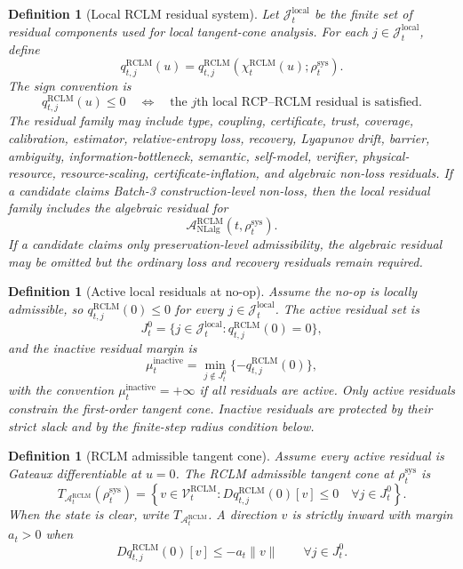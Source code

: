 \documentclass[11pt,a4paper]{article}
\newtheorem{definition}[theorem]{Definition}
\newcommand{\Acal}{\mathcal A}
\newcommand{\RCLM}{\mathrm{RCLM}}
\newcommand{\sys}{\mathrm{sys}}
\newcommand{\local}{\mathrm{local}}
\newcommand{\NLalg}{\mathrm{NLalg}}
\begin{document}
\begin{definition}[Local RCLM residual system]
\label{def:rclm-local-residual-system}
Let \(\mathcal J_t^{\local}\) be the finite set of residual components used for local tangent-cone analysis.  For each \(j\in\mathcal J_t^{\local}\), define
\[
q_{t,j}^{\RCLM}(u)
=
q_{t,j}^{\RCLM}(\chi_t^{\RCLM}(u);\rho_t^{\sys}).
\]
The sign convention is
\[
q_{t,j}^{\RCLM}(u)\le0
\quad\Longleftrightarrow\quad
\text{the }j\text{th local RCP--RCLM residual is satisfied.}
\]
The residual family may include type, coupling, certificate, trust, coverage, calibration, estimator, relative-entropy loss, recovery, Lyapunov drift, barrier, ambiguity, information-bottleneck, semantic, self-model, verifier, physical-resource, resource-scaling, certificate-inflation, and algebraic non-loss residuals.  If a candidate claims Batch-3 construction-level non-loss, then the local residual family includes the algebraic residual for
\[
\Acal_{\NLalg}^{\RCLM}(t,\rho_t^{\sys}).
\]
If a candidate claims only preservation-level admissibility, the algebraic residual may be omitted but the ordinary loss and recovery residuals remain required.
\end{definition}

\begin{definition}[Active local residuals at no-op]
\label{def:rclm-active-local-residuals}
Assume the no-op is locally admissible, so \(q_{t,j}^{\RCLM}(0)\le0\) for every \(j\in\mathcal J_t^{\local}\).  The active residual set is
\[
J_t^0=
\{j\in\mathcal J_t^{\local}:q_{t,j}^{\RCLM}(0)=0\},
\]
and the inactive residual margin is
\[
\mu_t^{\mathrm{inactive}}
=
\min_{j\notin J_t^0}\{-q_{t,j}^{\RCLM}(0)\},
\]
with the convention \(\mu_t^{\mathrm{inactive}}=+\infty\) if all residuals are active.  Only active residuals constrain the first-order tangent cone.  Inactive residuals are protected by their strict slack and by the finite-step radius condition below.
\end{definition}

\begin{definition}[RCLM admissible tangent cone]
\label{def:rclm-admissible-tangent-cone}
Assume every active residual is Gateaux differentiable at \(u=0\).  The RCLM admissible tangent cone at \(\rho_t^{\sys}\) is
\[
T_{\Acal_t^{\RCLM}}(\rho_t^{\sys})
=
\left\{
 v\in\mathcal V_t^{\RCLM}:
Dq_{t,j}^{\RCLM}(0)[v]\le0\quad\forall j\in J_t^0
\right\}.
\]
When the state is clear, write \(T_{\Acal_t^{\RCLM}}\).  A direction \(v\) is \emph{strictly inward} with margin \(a_t>0\) when
\[
Dq_{t,j}^{\RCLM}(0)[v]\le -a_t\|v\|
\qquad \forall j\in J_t^0.
\]
\end{definition}
\end{document}
